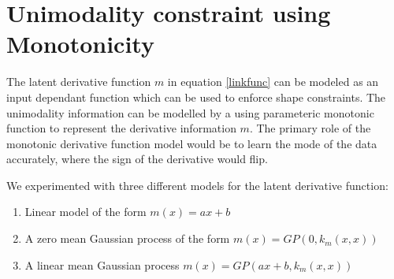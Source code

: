 \section{Unimodality constraint using Monotonicity}
The latent derivative function $m$ in equation \ref{linkfunc} can be modeled as an input dependant function which can be used to enforce shape constraints. The unimodality information can be modelled by a using parameteric monotonic function to represent the derivative information $m$. The primary role of the monotonic derivative function model would be to learn the mode of the data accurately, where the sign of the derivative would flip. 

We experimented with three different models for the latent derivative function:
\begin{enumerate}
	\item Linear model of the form $m(x)=ax+b$
	\item A zero mean Gaussian process of the form $m(x)=GP(0,k_m(x,x))$
	\item A linear mean Gaussian process $m(x)=GP(ax+b,k_m(x,x))$ 
\end{enumerate}






